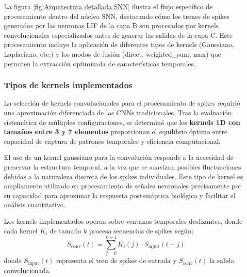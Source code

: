 La figura \ref{fig:Arquitectura detallada SNN} ilustra el flujo específico de procesamiento dentro del núcleo SNN, destacando cómo los trenes de spikes generados por las neuronas LIF de la capa B son procesados por kernels convolucionales especializados antes de generar las salidas de la capa C. Este procesamiento incluye la aplicación de diferentes tipos de kernels (Gaussiano, Laplaciano, etc.) y los modos de fusión (direct, weighted\_sum, max) que permiten la extracción optimizada de características temporales.


\subsubsection {Tipos de kernels implementados}

La selección de kernels convolucionales para el procesamiento de spikes requirió una aproximación diferenciada de las CNNs tradicionales. Tras la evaluación sistemática de múltiples configuraciones, se determinó que los \textbf{kernels 1D con tamaños entre 3 y 7 elementos} proporcionan el equilibrio óptimo entre capacidad de captura de patrones temporales y eficiencia computacional.

El uso de un kernel gaussiano para la convolución responde a la necesidad de preservar la estructura temporal, a la vez que se suavizan posibles fluctuaciones debidas a la naturaleza discreta de los spikes individuales. Este tipo de kernel es ampliamente utilizado en procesamiento de señales neuronales precisamente por su capacidad para aproximar la respuesta postsináptica biológica y facilitar el análisis cuantitativo.

Los kernels implementados operan sobre ventanas temporales deslizantes, donde cada kernel \( K_i \) de tamaño \( k \) procesa secuencias de spikes según:
\begin{equation}
    S_{\text{conv}}(t) = \sum_{j=0}^{k-1} K_i(j) \cdot S_{\text{input}}(t-j)
\end{equation}
donde \( S_{\text{input}}(t) \) representa el tren de spikes de entrada y \( S_{\text{conv}}(t) \) la salida convolucionada.




